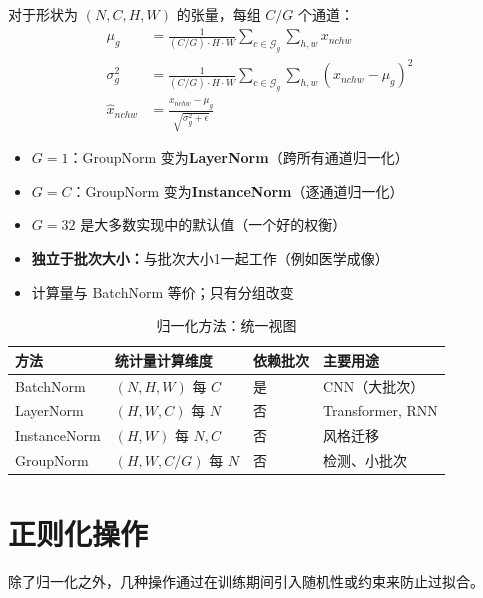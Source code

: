 对于形状为 $(N, C, H, W)$ 的张量，每组 $C/G$ 个通道：
\begin{align}
\mu_g &= \frac{1}{(C/G) \cdot H \cdot W} \sum_{c \in \mathcal{G}_g} \sum_{h,w} x_{nchw} \\
\sigma_g^2 &= \frac{1}{(C/G) \cdot H \cdot W} \sum_{c \in \mathcal{G}_g} \sum_{h,w} (x_{nchw} - \mu_g)^2 \\
\hat{x}_{nchw} &= \frac{x_{nchw} - \mu_g}{\sqrt{\sigma_g^2 + \epsilon}}
\end{align}

\begin{properties}[GN作为统一框架]
\begin{itemize}
    \item $G = 1$：GroupNorm 变为\textbf{LayerNorm}（跨所有通道归一化）
    \item $G = C$：GroupNorm 变为\textbf{InstanceNorm}（逐通道归一化）
    \item $G = 32$ 是大多数实现中的默认值（一个好的权衡）
    \item \textbf{独立于批次大小：}与批次大小1一起工作（例如医学成像）
    \item 计算量与 BatchNorm 等价；只有分组改变
\end{itemize}
\end{properties}

\begin{table}[ht]
    \centering
    \caption{归一化方法：统一视图}
    \begin{tabular}{L{2cm} L{3cm} L{2cm} L{3.5cm}}
        \toprule
        \textbf{方法} & \textbf{统计量计算维度} & \textbf{依赖批次} & \textbf{主要用途} \\
        \midrule
        BatchNorm & $(N, H, W)$ 每 $C$ & 是 & CNN（大批次） \\
        LayerNorm & $(H, W, C)$ 每 $N$ & 否 & Transformer, RNN \\
        InstanceNorm & $(H, W)$ 每 $N,C$ & 否 & 风格迁移 \\
        GroupNorm & $(H, W, C/G)$ 每 $N$ & 否 & 检测、小批次 \\
        \bottomrule
    \end{tabular}
\end{table}

\section{正则化操作}

除了归一化之外，几种操作通过在训练期间引入随机性或约束来防止过拟合。

